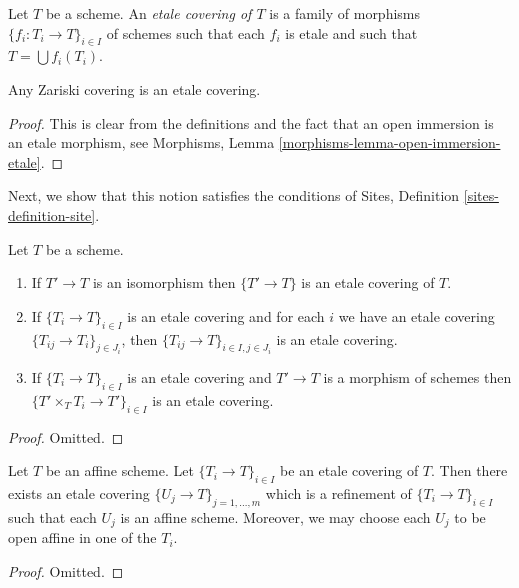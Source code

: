 \begin{definition}
\label{definition-etale-covering}
Let $T$ be a scheme. An {\it etale covering of $T$} is a family
of morphisms $\{f_i : T_i \to T\}_{i \in I}$ of schemes
such that each $f_i$ is etale and such that $T = \bigcup f_i(T_i)$.
\end{definition}

\begin{lemma}
\label{lemma-zariski-etale}
Any Zariski covering is an etale covering.
\end{lemma}

\begin{proof}
This is clear from the definitions and the fact that an open immersion
is an etale morphism, see
Morphisms, Lemma \ref{morphisms-lemma-open-immersion-etale}.
\end{proof}

\noindent
Next, we show that this notion satisfies the conditions of
Sites, Definition \ref{sites-definition-site}.

\begin{lemma}
\label{lemma-etale}
Let $T$ be a scheme.
\begin{enumerate}
\item If $T' \to T$ is an isomorphism then $\{T' \to T\}$
is an etale covering of $T$.
\item If $\{T_i \to T\}_{i\in I}$ is an etale covering and for each
$i$ we have an etale covering $\{T_{ij} \to T_i\}_{j\in J_i}$, then
$\{T_{ij} \to T\}_{i \in I, j\in J_i}$ is an etale covering.
\item If $\{T_i \to T\}_{i\in I}$ is an etale covering
and $T' \to T$ is a morphism of schemes then
$\{T' \times_T T_i \to T'\}_{i\in I}$ is an etale covering.
\end{enumerate}
\end{lemma}

\begin{proof}
Omitted.
\end{proof}

\begin{lemma}
\label{lemma-etale-affine}
Let $T$ be an affine scheme.
Let $\{T_i \to T\}_{i \in I}$ be an etale covering of $T$.
Then there exists an etale covering
$\{U_j \to T\}_{j = 1, \ldots, m}$ which is a refinement
of $\{T_i \to T\}_{i \in I}$ such that each $U_j$ is an affine
scheme. Moreover, we may choose each $U_j$ to be open affine
in one of the $T_i$.
\end{lemma}

\begin{proof}
Omitted.
\end{proof}

